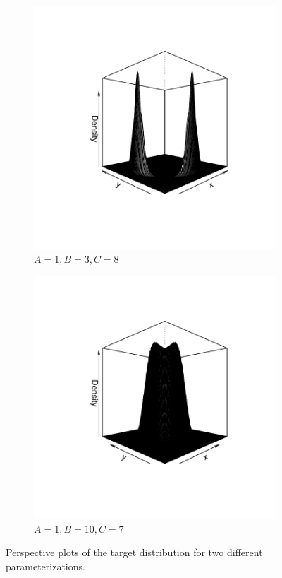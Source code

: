 \documentclass[11pt]{article}
\theoremstyle{remark}
\begin{document}
\begin{figure}[h]
    \centering
    \begin{subfigure}[h]{.4\textwidth}
        \centering
        \includegraphics[width = \textwidth]{plots/boom-3d_density_plot_1_3_8.pdf}
        \caption{$A = 1, B = 3, C = 8$}
        \label{subfig:boom-pers_1_3_8}
    \end{subfigure}
    \begin{subfigure}[h]{.4\textwidth}
        \centering
        \includegraphics[width = \textwidth]{plots/boom-3d_density_plot_1_10_7.pdf}
        \caption{$A = 1, B = 10, C = 7$}
        \label{subfig:boom-pers_1_10_7}
    \end{subfigure}
    \caption{Perspective plots of the target distribution for two different parameterizations.}
   \label{fig:3d_plot}
\end{figure}
\end{document}
